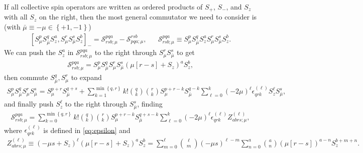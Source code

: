 \documentclass[aps,notitlepage,nofootinbib,11pt]{revtex4-1}
\newcommand{\p}[1]{\left(#1\right)} %
\renewcommand{\sp}[1]{\left[#1\right]} %
\renewcommand{\set}[1]{\left\{#1\right\}} %
\renewcommand{\S}{\mathcal{S}}
\newcommand{\bmu}{{\bar\mu}}
\newcommand{\1}{\mathds{1}}
\begin{document}
If all collective spin operators are written as ordered products of
$S_+$, $S_-$, and $S_z$ with all $S_z$ on the right, then the most
general commutator we need to consider is (with
$\bmu\equiv-\mu\in\set{+1,-1}$)
\begin{align}
  \sp{S_\mu^p S_\bmu^q S_z^a, S_\mu^r S_\bmu^s S_z^b}_-
  = \S^{pqa}_{rsb;\mu} - \S^{rsb}_{pqa;\mu},
  &&
  \S^{pqa}_{rsb;\mu}
  \equiv S_\mu^p S_\bmu^q S_z^a S_\mu^r S_\bmu^s S_z^b.
\end{align}
We can push the $S_z^a$ in $\S^{pqa}_{rsb;\mu}$ to the right through
$S_\mu^r S_\bmu^s$ to get
\begin{align}
  \S^{pqa}_{rsb;\mu}
  = S_\mu^p S_\bmu^q S_\mu^r S_\bmu^s  \p{\mu\sp{r-s}+S_z}^a S_z^b,
\end{align}
then commute $S_\bmu^q,S_\mu^r$ to expand
\begin{align}
  S_\mu^p S_\bmu^q S_\mu^r S_\bmu^s
  = S_\mu^{p+r} S_\bmu^{q+s} + \sum_{k=1}^{\min\set{q,r}}
  k! { q \choose k } { r \choose k } S_\mu^{p+r-k} S_\bmu^{q-k}
  \sum_{\ell=0}^k \p{-2\mu}^\ell \epsilon_{qrk}^{(\ell)}
  S_z^\ell S_\bmu^s,
\end{align}
and finally push $S_z^\ell$ to the right through $S_\bmu^s$, finding
\begin{align}
  \S^{pqa}_{rsb;\mu}
  = \sum_{k=0}^{\min\set{q,r}} k! { q \choose k } { r \choose k }
  S_\mu^{p+r-k} S_\bmu^{q+s-k}
  \sum_{\ell=0}^k \p{-2\mu}^\ell \epsilon_{qrk}^{(\ell)}
  Z_{abrs;\mu}^{(\ell)},
\end{align}
where $\epsilon_{qrk}^{(\ell)}$ is defined in \eqref{eq:epsilon} and
\begin{align}
  Z_{abrs;\mu}^{(\ell)}
  \equiv \p{-\mu s+S_z}^\ell \p{\mu\sp{r-s}+S_z}^a S_z^b
  = \sum_{m=0}^\ell { \ell \choose m } \p{-\mu s}^{\ell-m}
  \sum_{n=0}^a { a \choose n } \p{\mu\sp{r-s}}^{a-n} S_z^{b+m+n}.
\end{align}
\end{document}
